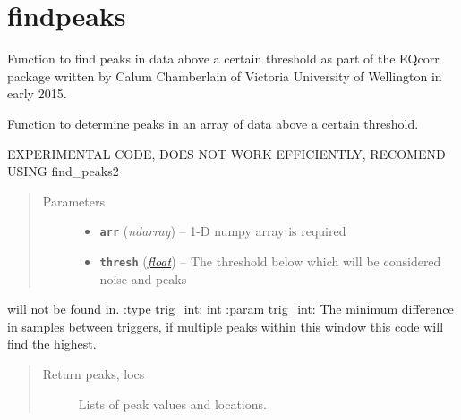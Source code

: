\documentclass[a4paper,10pt,english]{sphinxmanual}
\begin{document}
\section{findpeaks}
\label{modules:module-findpeaks}\label{modules:findpeaks}
Function to find peaks in data above a certain threshold as part of the EQcorr
package written by Calum Chamberlain of Victoria University of Wellington in
early 2015.

\begin{fulllineitems}
\label{modules:findpeaks.find_peaks}
Function to determine peaks in an array of data above a certain threshold.

EXPERIMENTAL CODE, DOES NOT WORK EFFICIENTLY, RECOMEND USING find\_peaks2
\begin{quote}\begin{description}
\item[{Parameters}] \leavevmode\begin{itemize}
\item {} 
\textbf{\texttt{arr}} (\emph{ndarray}) -- 1-D numpy array is required

\item {} 
\textbf{\texttt{thresh}} (\href{https://docs.python.org/library/functions.html\#float}{\emph{float}}) -- The threshold below which will be considered noise and peaks

\end{itemize}

\end{description}\end{quote}

will not be found in.
:type trig\_int: int
:param trig\_int: The minimum difference in samples between triggers,
if multiple peaks within this window this code will find the highest.
\begin{quote}\begin{description}
\item[{Return peaks, locs}] \leavevmode
Lists of peak values and locations.

\end{description}\end{quote}

\end{fulllineitems}

\end{document}
